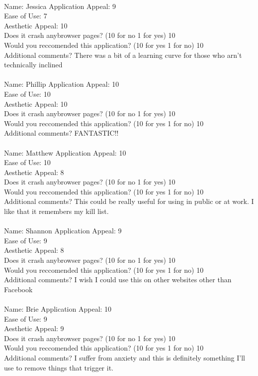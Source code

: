 \documentclass[12pt, titlepage]{article}
\begin{document}
\\
Name: Jessica
Application Appeal: 9 \\ 
Ease of Use: 7\\ 
Aesthetic Appeal: 10\\ 
Does it crash anybrowser pages? (10 for no 1 for yes) 10\\ 
Would you reccomended this application? (10 for yes 1 for no) 10\\ 
Additional comments? There was a bit of a learning curve for those who arn't technically inclined\\

\\
Name: Phillip
Application Appeal: 10 \\ 
Ease of Use: 10\\ 
Aesthetic Appeal: 10\\ 
Does it crash anybrowser pages? (10 for no 1 for yes) 10\\ 
Would you reccomended this application? (10 for yes 1 for no) 10\\ 
Additional comments? FANTASTIC!!\\

\\
Name: Matthew
Application Appeal: 10 \\ 
Ease of Use: 10\\ 
Aesthetic Appeal: 8\\ 
Does it crash anybrowser pages? (10 for no 1 for yes) 10\\ 
Would you reccomended this application? (10 for yes 1 for no) 10\\ 
Additional comments? This could be really useful for using in public or at work. I like that it remembers my kill list.\\

\\
Name: Shannon
Application Appeal: 9 \\ 
Ease of Use: 9\\ 
Aesthetic Appeal: 8\\ 
Does it crash anybrowser pages? (10 for no 1 for yes) 10\\ 
Would you reccomended this application? (10 for yes 1 for no) 10\\ 
Additional comments? I wish I could use this on other websites other than Facebook\\


\\
Name: Brie
Application Appeal: 10 \\ 
Ease of Use: 9\\ 
Aesthetic Appeal: 9\\ 
Does it crash anybrowser pages? (10 for no 1 for yes) 10\\ 
Would you reccomended this application? (10 for yes 1 for no) 10\\ 
Additional comments? I suffer from anxiety and this is definitely something I'll use to remove things that trigger it.\\
\end{document}
